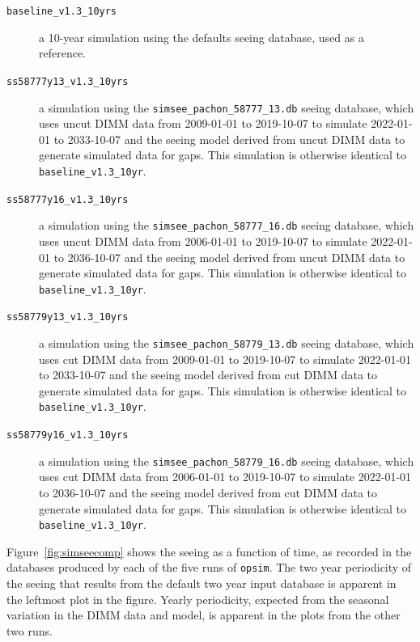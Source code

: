 \documentclass[DM,authoryear,toc]{lsstdoc}
\begin{document}
\begin{description}
   \item[{\tt baseline\_v1.3\_10yrs}] a 10-year simulation using the defaults
     seeing database, used as a reference.
  \item[{\tt ss58777y13\_v1.3\_10yrs}] a simulation using the
    {\tt simsee\_pachon\_58777\_13.db} seeing database, which uses
    uncut DIMM data from 2009-01-01 to 2019-10-07 to simulate
    2022-01-01 to 2033-10-07 and the seeing model derived from uncut
    DIMM data to generate simulated data for gaps. This simulation is otherwise identical
    to {\tt baseline\_v1.3\_10yr}.
  \item[{\tt ss58777y16\_v1.3\_10yrs}] a simulation using the
    {\tt simsee\_pachon\_58777\_16.db} seeing database, which uses
    uncut DIMM data from 2006-01-01 to 2019-10-07 to simulate
    2022-01-01 to 2036-10-07 and the seeing model derived from uncut
    DIMM data to generate simulated data for gaps. This simulation is otherwise identical
    to {\tt baseline\_v1.3\_10yr}.
  \item[{\tt ss58779y13\_v1.3\_10yrs}] a simulation using the
    {\tt simsee\_pachon\_58779\_13.db} seeing database, which uses
    cut DIMM data from 2009-01-01 to 2019-10-07 to simulate 2022-01-01
    to 2033-10-07 and the seeing model derived from cut DIMM data to
    generate simulated data for gaps. This simulation is otherwise
    identical to {\tt baseline\_v1.3\_10yr}.
  \item[{\tt ss58779y16\_v1.3\_10yrs}] a simulation using the
    {\tt simsee\_pachon\_58779\_16.db} seeing database, which uses
    cut DIMM data from 2006-01-01 to 2019-10-07 to simulate 2022-01-01
    to 2036-10-07 and the seeing model derived from cut DIMM data to
    generate simulated data for gaps. This simulation is otherwise
    identical to {\tt baseline\_v1.3\_10yr}.
\end{description}

Figure~\ref{fig:simseecomp} shows the seeing as a function of time, as
recorded in the databases produced by each of the five runs of
\texttt{opsim}. The two year periodicity of the seeing that results
from the default two year input database is apparent in the leftmost
plot in the figure. Yearly periodicity, expected from the seasonal
variation in the DIMM data and model, is apparent in the plots from
the other two runs. 
\end{document}
